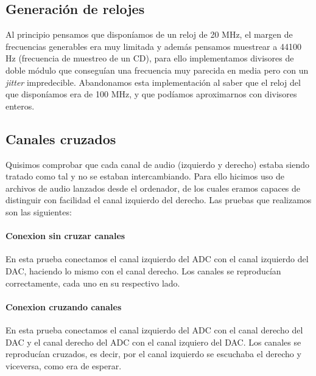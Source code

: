 	\subsection{Generación de relojes}
		Al principio pensamos que disponíamos de un reloj de 20 MHz, el margen de frecuencias generables era muy limitada  y además pensamos muestrear a 44100 Hz (frecuencia de muestreo de un CD), para ello implementamos divisores de doble módulo \cite{Fraccional divider in VHDL} que conseguían una frecuencia muy parecida en media pero con un \emph{jitter} impredecible. Abandonamos esta implementación al saber que el reloj del que disponíamos era de 100 MHz, y que podíamos aproximarnos con divisores enteros.

	

	\subsection{Canales cruzados}

		Quisimos comprobar que cada canal de audio (izquierdo y derecho) estaba siendo tratado como tal y no se estaban intercambiando. Para ello hicimos uso de archivos de audio lanzados desde el ordenador, de los cuales eramos capaces de distinguir con facilidad el canal izquierdo del derecho. Las pruebas que realizamos son las siguientes:

		\paragraph{Conexion sin cruzar canales}
			En esta prueba conectamos el canal izquierdo del ADC con el canal izquierdo del DAC, haciendo lo mismo con el canal derecho. Los canales se reproducían correctamente, cada uno en su respectivo lado.


		\paragraph{Conexion cruzando canales}
			En esta prueba conectamos el canal izquierdo del ADC con el canal derecho del DAC y el canal derecho del ADC con el canal izquiero del DAC. Los canales se reproducían cruzados, es decir, por el canal izquierdo se escuchaba el derecho y viceversa, como era de esperar.\\

